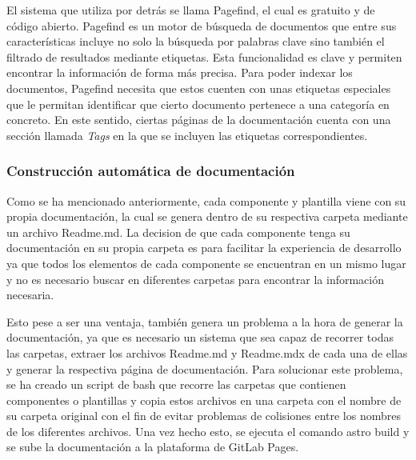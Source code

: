El sistema que utiliza por detrás se llama Pagefind, el cual es gratuito 
y de código abierto. Pagefind es un motor de búsqueda de documentos
que entre sus características incluye no solo la búsqueda por palabras
clave sino también el filtrado de resultados mediante etiquetas. Esta 
funcionalidad es clave y permiten encontrar la información de forma más precisa. 
Para poder indexar los documentos, Pagefind necesita que estos cuenten con
unas etiquetas especiales que le permitan identificar que cierto documento
pertenece a una categoría en concreto. En este sentido, ciertas páginas
de la documentación cuenta con una sección llamada \textit{Tags} en la que
se incluyen las etiquetas correspondientes.


\subsubsection{Construcción automática de documentación}
Como se ha mencionado anteriormente, cada componente y plantilla 
viene con su propia documentación, la cual se genera dentro de su
respectiva carpeta mediante un archivo Readme.md. La decision de 
que cada componente tenga su documentación en su propia carpeta
es para facilitar la experiencia de desarrollo ya que todos los
elementos de cada componente se encuentran en un mismo lugar y no
es necesario buscar en diferentes carpetas para encontrar la
información necesaria.\medskip

Esto pese a ser una ventaja, también genera un problema a la hora de
generar la documentación, ya que es necesario un sistema que sea
capaz de recorrer todas las carpetas, extraer los archivos Readme.md
y Readme.mdx de cada una de ellas y generar la respectiva página
de documentación. Para solucionar este problema, se ha creado un
script de bash que recorre las carpetas que contienen componentes o
plantillas y copia estos archivos en una carpeta con el nombre de
su carpeta original con el fin de evitar problemas de colisiones
entre los nombres de los diferentes archivos. Una vez hecho esto,
se ejecuta el comando astro build y se sube la documentación a la
plataforma de GitLab Pages.

